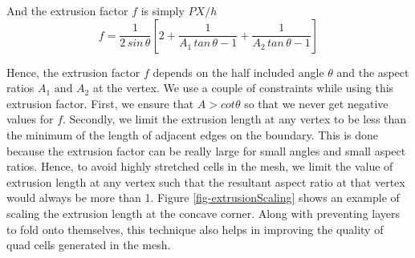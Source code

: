 \documentclass[conf]{new-aiaa}
\begin{document}
And the extrusion factor $f$ is simply $PX/h$
\begin{equation}
    f = \dfrac{1}{2 \, sin \, \theta} \left[ 2 + \dfrac{1}{A_1\, tan \, \theta - 1} + \dfrac{1}{A_2\, tan \, \theta - 1} \right]
\end{equation}

Hence, the extrusion factor $f$ depends on the half included angle $\theta$ and the aspect ratios $A_1 \text{ and } A_2$ at the vertex. We use a couple of constraints while using this extrusion factor. First, we ensure that $A > cot \theta$ so that we never get negative values for $f$. Secondly, we limit the extrusion length at any vertex to be less than the minimum of the length of adjacent edges on the boundary. This is done because the extrusion factor can be  really large for small angles and small aspect ratios. Hence, to avoid highly stretched cells in the mesh, we limit the value of extrusion length at any vertex such that the resultant aspect ratio at that vertex would always be more than 1. Figure \ref{fig-extrusionScaling} shows an example of scaling the extrusion length at the concave corner. Along with preventing layers to fold onto themselves, this technique also helps in improving the quality of quad cells generated in the mesh.

\end{document}
